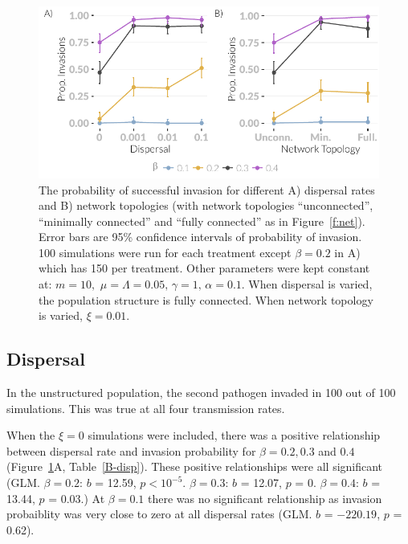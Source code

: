\begin{knitrout}\footnotesize
{}\color{fgcolor}\begin{figure}[t]

{\centering \includegraphics[width=\textwidth]{figure/invasionPropPlots-1} 

}

\caption[The probability of invasion across different dispersal rates and network topologies.]{
  The probability of successful invasion for different A) dispersal rates and B) network topologies (with network topologies ``unconnected'', ``minimally connected'' and ``fully connected'' as in Figure~\ref{f:net}). 
  Error bars are 95\% confidence intervals of probability of invasion. 
  100 simulations were run for each treatment except $\beta = 0.2$ in A) which has 150 per treatment.
  Other parameters were kept constant at: $m = 10,\, \, \mu = \Lambda = 0.05,\, \gamma = 1,\, \alpha = 0.1$. 
  When dispersal is varied, the population structure is fully connected. 
  When network topology is varied, $\xi = 0.01$.}\label{f:invasionPropPlots}
\end{figure}


\end{knitrout}


\subsection{Dispersal}

In the unstructured population, the second pathogen invaded in 100 out of 100 simulations.
This was true at all four transmission rates.

When the $\xi = 0$ simulations were included, there was a positive relationship between dispersal rate and invasion probability for $\beta = 0.2, 0.3$ and $0.4$ (Figure~\ref{f:invasionPropPlots}A, Table~\ref{B-disp}).
These positive relationships were all significant (GLM. $\beta = 0.2$: $b$ = 12.59, $p < 10^{-5}$. $\beta = 0.3$: $b$ = 12.07, $p$ = 0. $\beta = 0.4$: $b$ = 13.44, $p$ = 0.03.)
At $\beta = 0.1$ there was no significant relationship as invasion probaiblity was very close to zero at all dispersal rates (GLM. $b$ = \ensuremath{-220.19}, $p$ = 0.62).


